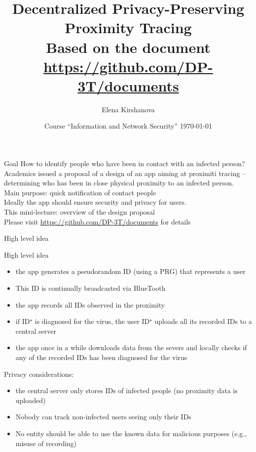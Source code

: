 \documentclass[usenames,dvipsnames, 9pt]{beamer}
\author{Elena Kirshanova \\ [10pt]
}
\title{\Huge Decentralized Privacy-Preserving Proximity Tracing \\[5pt]
\Large Based on the document \url{https://github.com/DP-3T/documents}
}
\date{ Course ``Information and Network Security''  \today }
\begin{document}
	
\begin{frame}
	\titlepage
\end{frame}

\begin{frame}{Goal}
	\Large 
		{\color{Orange}  How to identify people who have been in contact with an infected person? }\\[5pt]
	\pause
	Academics issued a proposal of a design of an app aiming at 	{\color{Orange} proximiti tracing} -- determining who has been in close physical proximity to an infected person.\\[10pt]
	
	Main purpose: quick notification of contact people \\[10pt]
	
	{\color{Orange} Ideally} the app should ensure {\color{Orange}security} and {\color{Orange} privacy} for users.  \\
	
	This mini-lecture: overview of the design proposal \\
	
	
	\vfill
	Please visit \url{https://github.com/DP-3T/documents} for  details
	
\end{frame}

\begin{frame}{High level idea}
	
\end{frame}


\begin{frame}{High level idea}
\begin{itemize}
	\item the app generates a pseudorandom ID (using a PRG) that represents a user 
	\item This ID is continually broadcasted via BlueTooth
	\item the app records all IDs observed in the proximity
	\item if ID$^\star$ is diagnosed for the virus, the user ID$^\star$ uploads all its recorded IDs to a central server
	\item  the app once in a while downloads data from the severs and locally checks if any of the recorded IDs has been diagnosed for the virus
\end{itemize}
\pause
{\color{Orange} Privacy} considerations:
\begin{itemize}
\item the central server only stores IDs of infected people (no proximity data is uploaded)
\item Nobody can track non-infected users seeing only their IDs
\item No entity should be able to use the known data for  malicious purposes (e.g.,  misuse of recording)
\end{itemize}
\end{frame}
\end{document}

